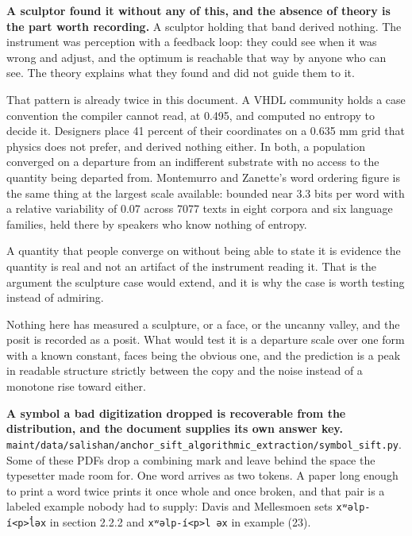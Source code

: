 \textbf{A sculptor found it without any of this, and the absence of theory is the part worth recording.} A sculptor holding that band derived nothing. The instrument was perception with a feedback loop: they could see when it was wrong and adjust, and the optimum is reachable that way by anyone who can see. The theory explains what they found and did not guide them to it.

That pattern is already twice in this document. A VHDL community holds a case convention the compiler cannot read, at 0.495, and computed no entropy to decide it. Designers place 41 percent of their coordinates on a 0.635 mm grid that physics does not prefer, and derived nothing either. In both, a population converged on a departure from an indifferent substrate with no access to the quantity being departed from. Montemurro and Zanette's word ordering figure is the same thing at the largest scale available: bounded near 3.3 bits per word with a relative variability of 0.07 across 7077 texts in eight corpora and six language families, held there by speakers who know nothing of entropy.

A quantity that people converge on without being able to state it is evidence the quantity is real and not an artifact of the instrument reading it. That is the argument the sculpture case would extend, and it is why the case is worth testing instead of admiring.

Nothing here has measured a sculpture, or a face, or the uncanny valley, and the posit is recorded as a posit. What would test it is a departure scale over one form with a known constant, faces being the obvious one, and the prediction is a peak in readable structure strictly between the copy and the noise instead of a monotone rise toward either.

\textbf{A symbol a bad digitization dropped is recoverable from the distribution, and the document supplies its own answer key.} \texttt{maint/\allowbreak{}data/\allowbreak{}salishan/\allowbreak{}anchor\_\allowbreak{}sift\_\allowbreak{}algorithmic\_\allowbreak{}extraction/\allowbreak{}symbol\_\allowbreak{}sift.\allowbreak{}py}. Some of these PDFs drop a combining mark and leave behind the space the typesetter made room for. One word arrives as two tokens. A paper long enough to print a word twice prints it once whole and once broken, and that pair is a labeled example nobody had to supply: Davis and Mellesmoen sets \texttt{xʷəlp-\allowbreak{}í<p>l̓əx} in section 2.2.2 and \texttt{xʷəlp-\allowbreak{}í<p>l əx} in example (23).

